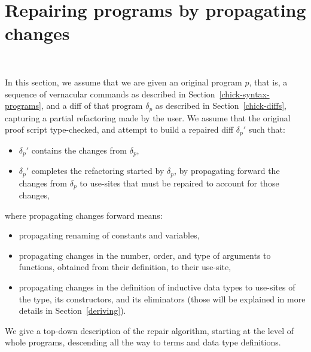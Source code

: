 \section{Repairing programs by propagating changes}~\label{chick-repair}

In this section, we assume that we are given an original program $p$, that is, a
sequence of vernacular commands as described in
Section~\ref{chick-syntax-programs}, and a diff of that program $\delta_p$ as
described in Section~\ref{chick-diffs}, capturing a partial refactoring made by
the user.  We assume that the original proof script type-checked, and attempt to
build a repaired diff $\delta_p'$ such that:

\begin{itemize}

\item $\delta_p'$ contains the changes from $\delta_p$,

\item $\delta_p'$ completes the refactoring started by $\delta_p$, by
propagating forward the changes from $\delta_p$ to use-sites that must be
repaired to account for those changes,

\end{itemize}
%
where propagating changes forward means:

\begin{itemize}

\item propagating renaming of constants and variables,

\item propagating changes in the number, order, and type of arguments to
functions, obtained from their definition, to their use-site,

\item propagating changes in the definition of inductive data types to use-sites
of the type, its constructors, and its eliminators (those will be explained in
more details in Section~\ref{deriving}).

\end{itemize}

We give a top-down description of the repair algorithm, starting at the level of
whole programs, descending all the way to terms and data type definitions.








